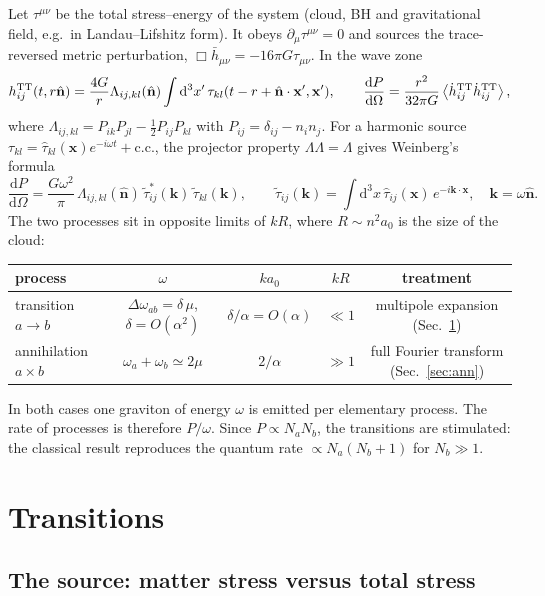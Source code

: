 \documentclass[11pt]{article}
\newcommand{\dd}{\mathrm{d}}
\newcommand{\bx}{\mathbf x}
\newcommand{\bk}{\mathbf k}
\newcommand{\nhat}{\hat{\mathbf n}}
\begin{document}
Let $\tau^{\mu\nu}$ be the total stress--energy of the system (cloud, BH and gravitational field, e.g.\ in Landau--Lifshitz form). It obeys $\partial_\mu\tau^{\mu\nu}=0$ and sources the trace-reversed metric perturbation, $\Box\bar h_{\mu\nu}=-16\pi G\tau_{\mu\nu}$. In the wave zone
\begin{equation}
h^{\rm TT}_{ij}(t,r\nhat)=\frac{4G}{r}\Lambda_{ij,kl}(\nhat)\int\dd^3x'\,\tau_{kl}(t-r+\nhat\cdot\bx',\bx'),\qquad
\frac{\dd P}{\dd\Omega}=\frac{r^2}{32\pi G}\left\langle\dot h^{\rm TT}_{ij}\dot h^{\rm TT}_{ij}\right\rangle ,
\end{equation}
where $\Lambda_{ij,kl}=P_{ik}P_{jl}-\tfrac12P_{ij}P_{kl}$ with $P_{ij}=\delta_{ij}-n_in_j$. For a harmonic source $\tau_{kl}=\hat\tau_{kl}(\bx)e^{-i\omega t}+\mathrm{c.c.}$, the projector property $\Lambda\Lambda=\Lambda$ gives Weinberg's formula~\cite{Weinberg}
\begin{equation}
\frac{\dd P}{\dd\Omega}=\frac{G\omega^2}{\pi}\,\Lambda_{ij,kl}(\nhat)\,\tilde\tau^*_{ij}(\bk)\,\tilde\tau_{kl}(\bk),\qquad
\tilde\tau_{ij}(\bk)=\int\dd^3x\,\hat\tau_{ij}(\bx)\,e^{-i\bk\cdot\bx},\quad\bk=\omega\nhat .
\label{eq:weinberg}
\end{equation}
The two processes sit in opposite limits of $kR$, where $R\sim n^2a_0$ is the size of the cloud:
\begin{center}
\begin{tabular}{@{}lcccc@{}}
\toprule
process & $\omega$ & $k a_0$ & $kR$ & treatment\\
\midrule
transition $a\to b$ & $\Delta\omega_{ab}=\delta\,\mu$, $\delta=O(\alpha^2)$ & $\delta/\alpha=O(\alpha)$ & $\ll1$ & multipole expansion (Sec.~\ref{sec:tr})\\
annihilation $a\times b$ & $\omega_a+\omega_b\simeq2\mu$ & $2/\alpha$ & $\gg1$ & full Fourier transform (Sec.~\ref{sec:ann})\\
\bottomrule
\end{tabular}
\end{center}
In both cases one graviton of energy $\omega$ is emitted per elementary process. The rate of processes is therefore $P/\omega$. Since $P\propto N_aN_b$, the transitions are stimulated: the classical result reproduces the quantum rate $\propto N_a(N_b+1)$ for $N_b\gg1$.

\section{Transitions}
\label{sec:tr}

\subsection{The source: matter stress versus total stress}
\label{sec:source}
\end{document}
